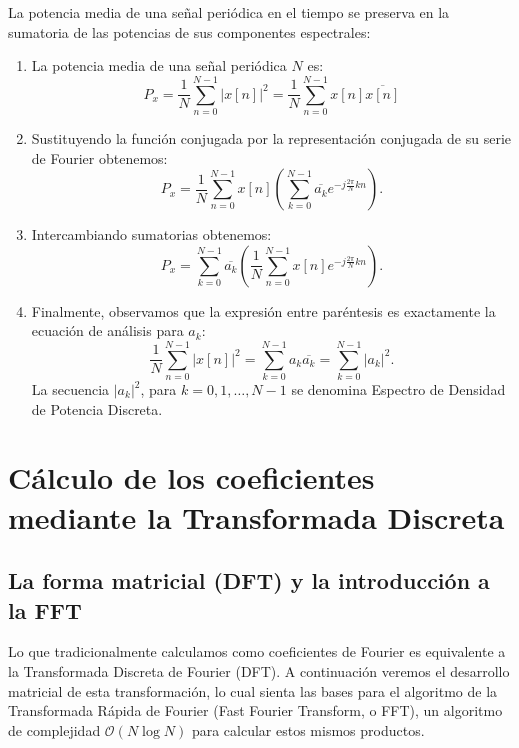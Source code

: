 La potencia media de una señal periódica en el tiempo se preserva en la sumatoria de las potencias de sus componentes espectrales:
\begin{enumerate}
	\item La potencia media de una señal periódica $N$ es:
	\begin{equation}
		P_x = \frac{1}{N}\sum_{n=0}^{N-1} |x[n]|^{2} = \frac{1}{N}\sum_{n=0}^{N-1} x[n] \overline{x[n]}
	\end{equation}
	
	\item Sustituyendo la función conjugada por la representación conjugada de su serie de Fourier obtenemos:
	\begin{equation}
		P_x = \frac{1}{N} \sum_{n=0}^{N-1} x[n] \left(\sum_{k=0}^{N-1} \overline{a_{k}} e^{-j\frac{2\pi}{N}kn} \right).
	\end{equation}
	
	\item Intercambiando sumatorias obtenemos:
	\begin{equation}
		P_x = \sum_{k=0}^{N-1} \overline{a_{k}} \left( \frac{1}{N}\sum_{n=0}^{N-1} x[n] e^{-j\frac{2\pi}{N}kn} \right).
	\end{equation}
	
	\item Finalmente, observamos que la expresión entre paréntesis es exactamente la ecuación de análisis para $a_{k}$:
	\begin{equation}
		\frac{1}{N}\sum_{n=0}^{N-1} |x[n]|^{2} = \sum_{k=0}^{N-1} a_{k} \overline{a_{k}} = \sum_{k=0}^{N-1} |a_{k}|^2.
	\end{equation}
	La secuencia $|a_{k}|^{2}$, para $k = 0, 1, \dots, N - 1$ se denomina Espectro de Densidad de Potencia Discreta.
\end{enumerate}

\section{Cálculo de los coeficientes mediante la Transformada Discreta}

\subsection{La forma matricial (DFT) y la introducción a la FFT}

Lo que tradicionalmente calculamos como coeficientes de Fourier es equivalente a la Transformada Discreta de Fourier (DFT). A continuación veremos el desarrollo matricial de esta transformación, lo cual sienta las bases para el algoritmo de la Transformada Rápida de Fourier (Fast Fourier Transform, o FFT), un algoritmo de complejidad $\mathcal{O}(N \log N)$ para calcular estos mismos productos.

